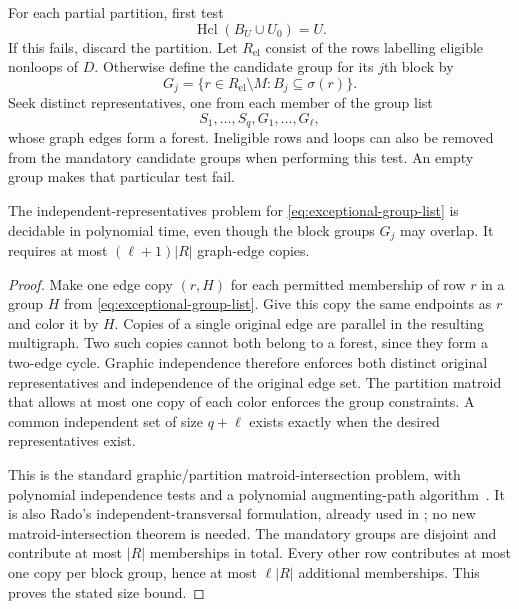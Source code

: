 For each partial partition, first test
\begin{equation}
                    \operatorname{Hcl}(B_U\cup U_0)=U.
                    \label{eq:exceptional-partition-test}
\end{equation}
If this fails, discard the partition.  Let $R_{\mathrm{el}}$ consist of
the rows labelling eligible nonloops of $D$.  Otherwise define the
candidate group for its $j$th block by
\begin{equation}
       G_j=\{r\in R_{\mathrm{el}}\setminus M:
                                      B_j\subseteq\sigma(r)\}.
       \label{eq:exceptional-block-group}
\end{equation}
Seek distinct representatives, one from each member of the group list
\begin{equation}
                    S_1,\ldots,S_q,G_1,\ldots,G_\ell,
                    \label{eq:exceptional-group-list}
\end{equation}
whose graph edges form a forest.  Ineligible rows and loops can also be
removed from the mandatory candidate groups when performing this test.
An empty group makes that particular test fail.

\begin{lemma}
\label{lem:exceptional-clones}
The independent-representatives problem for
\eqref{eq:exceptional-group-list} is decidable in polynomial time, even
though the block groups $G_j$ may overlap.  It requires at most
$(\ell+1)|R|$ graph-edge copies.
\end{lemma}

\begin{proof}
Make one edge copy $(r,H)$ for each permitted membership of row $r$ in a
group $H$ from \eqref{eq:exceptional-group-list}.  Give this copy the same
endpoints as $r$ and color it by $H$.  Copies of a single original edge
are parallel in the resulting multigraph.  Two such copies cannot both
belong to a forest, since they form a two-edge cycle.  Graphic
independence therefore enforces both distinct original representatives
and independence of the original edge set.  The partition matroid that
allows at most one copy of each color enforces the group constraints.
A common independent set of size $q+\ell$ exists exactly when the desired
representatives exist.

This is the standard graphic/partition matroid-intersection problem,
with polynomial independence tests and a polynomial augmenting-path
algorithm~\cite{Edmonds1970,Rado1942}.  It is also Rado's independent-transversal formulation,
already used in \cite{IncomingDualNormalization}; no new
matroid-intersection theorem is needed.  The mandatory groups are
disjoint and contribute at most $|R|$ memberships in total.  Every other
row contributes at most one copy per block group, hence at most
$\ell|R|$ additional memberships.  This proves the stated size bound.
\end{proof}

